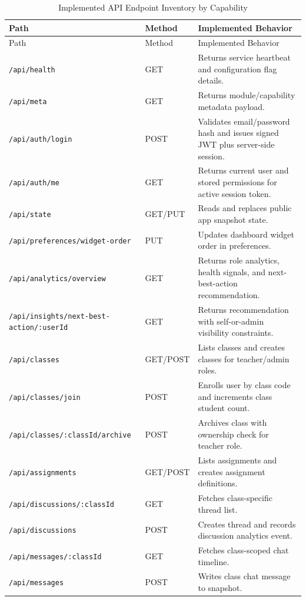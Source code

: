 \begin{longtable}{>{\raggedright\arraybackslash}p{2.4cm} >{\raggedright\arraybackslash}p{1.7cm} >{\raggedright\arraybackslash}p{7.8cm}}
\caption{Implemented API Endpoint Inventory by Capability}\\
\toprule
Path & Method & Implemented Behavior \\
\midrule
\endfirsthead
\toprule
Path & Method & Implemented Behavior \\
\midrule
\endhead
\texttt{/api/health} & GET & Returns service heartbeat and configuration flag details. \\
\texttt{/api/meta} & GET & Returns module/capability metadata payload. \\
\texttt{/api/auth/login} & POST & Validates email/password hash and issues signed JWT plus server-side session. \\
\texttt{/api/auth/me} & GET & Returns current user and stored permissions for active session token. \\
\texttt{/api/state} & GET/PUT & Reads and replaces public app snapshot state. \\
\texttt{/api/preferences/widget-order} & PUT & Updates dashboard widget order in preferences. \\
\texttt{/api/analytics/overview} & GET & Returns role analytics, health signals, and next-best-action recommendation. \\
\texttt{/api/insights/next-best-action/:userId} & GET & Returns recommendation with self-or-admin visibility constraints. \\
\texttt{/api/classes} & GET/POST & Lists classes and creates classes for teacher/admin roles. \\
\texttt{/api/classes/join} & POST & Enrolls user by class code and increments class student count. \\
\texttt{/api/classes/:classId/archive} & POST & Archives class with ownership check for teacher role. \\
\texttt{/api/assignments} & GET/POST & Lists assignments and creates assignment definitions. \\
\texttt{/api/discussions/:classId} & GET & Fetches class-specific thread list. \\
\texttt{/api/discussions} & POST & Creates thread and records discussion analytics event. \\
\texttt{/api/messages/:classId} & GET & Fetches class-scoped chat timeline. \\
\texttt{/api/messages} & POST & Writes class chat message to snapshot. \\

\end{longtable}
